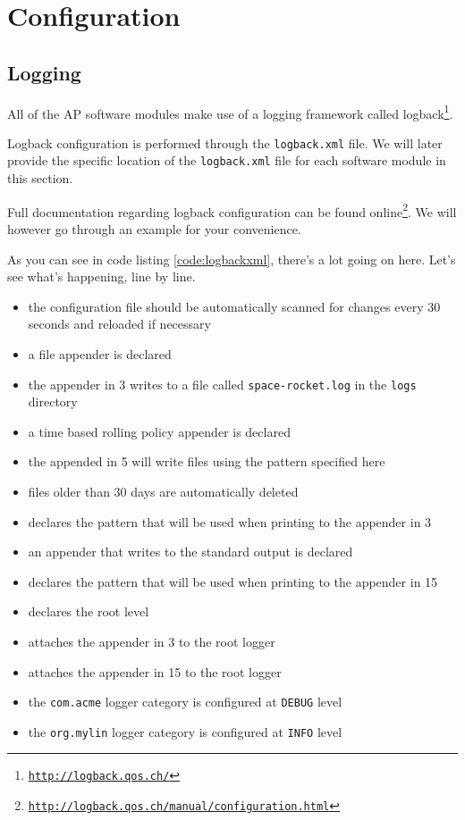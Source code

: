 \section{Configuration}

\subsection{Logging}
\label{sec:logging}

All of the \ac{AP} software modules make use of a logging framework called logback\footnote{\href{http://logback.qos.ch/}{\texttt{http://logback.qos.ch/}}}. 

Logback configuration is performed through the \texttt{logback.xml} file. We will later provide the specific location of the \texttt{logback.xml} file for each software module in this section.

Full documentation regarding logback configuration can be found online\footnote{\href{http://logback.qos.ch/manual/configuration.html}{\texttt{http://logback.qos.ch/manual/configuration.html}}}. We will however go through an example for your convenience.



As you can see in code listing \ref{code:logbackxml}, there's a lot going on here. Let's see what's happening, line by line.

\begin{itemize}
\item[2] the configuration file should be automatically scanned for changes every 30 seconds and reloaded if necessary
\item[3] a file appender is declared
\item[4] the appender in 3 writes to a file called \texttt{space-rocket.log} in the \texttt{logs} directory
\item[5] a time based rolling policy appender is declared
\item[7] the appended in 5 will write files using the pattern specified here
\item[9] files older than 30 days are automatically deleted
\item[12] declares the pattern that will be used when printing to the appender in 3
\item[15] an appender that writes to the standard output is declared
\item[17] declares the pattern that will be used when printing to the appender in 15
\item[20] declares the root level
\item[21] attaches the appender in 3 to the root logger
\item[22] attaches the appender in 15 to the root logger
\item[24,25] the \texttt{com.acme} logger category is configured at \texttt{DEBUG} level
\item[27,28] the \texttt{org.mylin} logger category is configured at \texttt{INFO} level
\end{itemize}
